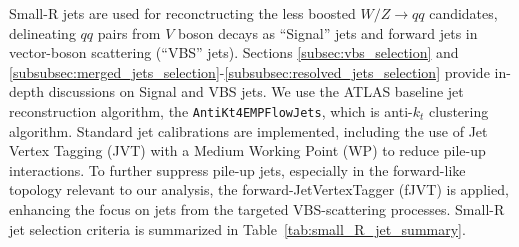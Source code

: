 Small-R jets are used for reconctructing the less boosted $W/Z \to qq$ candidates, delineating \(qq\) pairs from \(V\) boson decays as ``Signal'' jets and forward jets in vector-boson scattering (``VBS'' jets). Sections \ref{subsec:vbs_selection} and \ref{subsubsec:merged_jets_selection}-\ref{subsubsec:resolved_jets_selection} provide in-depth discussions on Signal and VBS jets. We use the ATLAS baseline jet reconstruction algorithm, the \texttt{AntiKt4EMPFlowJets}, which is anti-$k_t$ clustering algorithm.
Standard jet calibrations are implemented, including the use of Jet Vertex Tagging (JVT) with a Medium Working Point (WP) to reduce pile-up interactions. 
To further suppress pile-up jets, especially in the forward-like topology relevant to our analysis, the forward-JetVertexTagger (fJVT) is applied, enhancing the focus on jets from the targeted VBS-scattering processes.
Small-R jet selection criteria is summarized in Table~\ref{tab:small_R_jet_summary}.




